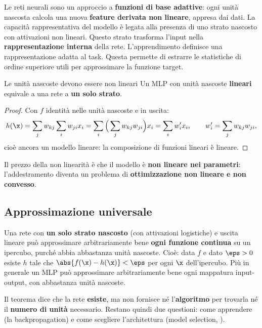 \begin{idea}
Le reti neurali sono un approccio a \textbf{funzioni di base adattive}: ogni unità nascosta calcola una nuova
\textbf{feature derivata non lineare}, appresa dai dati. La capacità rappresentativa del modello è legata alla
presenza di uno strato nascosto con attivazioni non lineari. Questo strato trasforma l'input nella
\textbf{rappresentazione interna} della rete. L'apprendimento definisce una rappresentazione adatta al task. Questa
permette di estrarre le statistiche di ordine superiore utili per approssimare la funzione target.
\end{idea}

\begin{proprieta}{Le unità nascoste devono essere non lineari}
Un MLP con unità nascoste \textbf{lineari} equivale a una rete a \textbf{un solo strato}.
\end{proprieta}
\begin{proof}
Con $f$ identità nelle unità nascoste e in uscita:
\[
h(\x) = \sum_jw_{kj}\sum_iw_{ji}x_i = \sum_i\Big(\sum_jw_{kj}w_{ji}\Big)x_i = \sum_iw'_ix_i ,\qquad w'_i = \sum_jw_{kj}w_{ji},
\]
cioè ancora un modello lineare: la composizione di funzioni lineari è lineare.
\end{proof}

Il prezzo della non linearità è che il modello è \textbf{non lineare nei parametri}: l'addestramento diventa un
problema di \textbf{ottimizzazione non lineare e non convesso}.

\subsection{Approssimazione universale}
\label{sec:approssimazione-universale}

\begin{teorema}
Una rete con \textbf{un solo strato nascosto} (con attivazioni logistiche) e uscita lineare può approssimare
arbitrariamente bene \textbf{ogni funzione continua} su un ipercubo, purché abbia abbastanza unità nascoste. Cioè:
data $f$ e dato $\eps>0$ esiste $h$ tale che $\abs{f(\x)-h(\x)}<\eps$ per ogni $\x$ dell'ipercubo. Più in generale un
MLP può approssimare arbitrariamente bene ogni mappatura input-output, con abbastanza unità nascoste.
\end{teorema}

\begin{attenzione}
Il teorema dice che la rete \textbf{esiste}, ma non fornisce né l'\textbf{algoritmo} per trovarla né il
\textbf{numero di unità} necessario. Restano quindi due questioni: come apprendere (la backpropagation) e come
scegliere l'architettura (model selection, ).
\end{attenzione}

